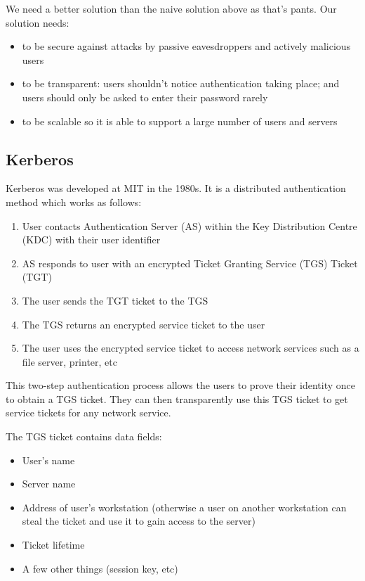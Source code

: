 We need a better solution than the naive solution above as that's pants. Our solution needs:
\begin{itemize}
    \item to be secure against attacks by passive eavesdroppers and actively malicious users
    \item to be transparent: users shouldn't notice authentication taking place; and users should only be asked to enter their password rarely
    \item to be scalable so it is able to support a large number of users and servers
\end{itemize}

\subsection{Kerberos}
Kerberos was developed at MIT in the 1980s. It is a distributed authentication method which works as follows:
\begin{enumerate}
    \item User contacts Authentication Server (AS) within the Key Distribution Centre (KDC) with their user identifier
    \item AS responds to user with an encrypted Ticket Granting Service (TGS) Ticket (TGT)
    \item The user sends the TGT ticket to the TGS
    \item The TGS returns an encrypted service ticket to the user
    \item The user uses the encrypted service ticket to access network services such as a file server, printer, etc
\end{enumerate}

This two-step authentication process allows the users to prove their identity once to obtain a TGS ticket. They can then transparently use this TGS ticket to get service tickets for any network service.

The TGS ticket contains data fields:
\begin{itemize}
    \item User's name
    \item Server name
    \item Address of user's workstation (otherwise a user on another workstation can steal the ticket and use it to gain access to the server)
    \item Ticket lifetime
    \item A few other things (session key, etc)
\end{itemize}

